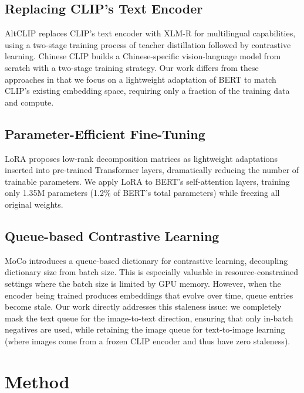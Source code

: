 \documentclass[10pt,leqno]{amsart}
\begin{document}
\subsection{Replacing CLIP's Text Encoder}

AltCLIP \citep{chen2022altclip} replaces CLIP's text encoder with XLM-R \citep{conneau2020xlmr} for multilingual capabilities, using a two-stage training process of teacher distillation followed by contrastive learning. Chinese CLIP \citep{yang2022chinese} builds a Chinese-specific vision-language model from scratch with a two-stage training strategy. Our work differs from these approaches in that we focus on a lightweight adaptation of BERT \citep{devlin2019bert} to match CLIP's existing embedding space, requiring only a fraction of the training data and compute.

\subsection{Parameter-Efficient Fine-Tuning}

LoRA \citep{hu2022lora} proposes low-rank decomposition matrices as lightweight adaptations inserted into pre-trained Transformer layers, dramatically reducing the number of trainable parameters. We apply LoRA to BERT's self-attention layers, training only 1.35M parameters (1.2\% of BERT's total parameters) while freezing all original weights.

\subsection{Queue-based Contrastive Learning}

MoCo \citep{he2020moco} introduces a queue-based dictionary for contrastive learning, decoupling dictionary size from batch size. This is especially valuable in resource-constrained settings where the batch size is limited by GPU memory. However, when the encoder being trained produces embeddings that evolve over time, queue entries become stale. Our work directly addresses this staleness issue: we completely mask the text queue for the image-to-text direction, ensuring that only in-batch negatives are used, while retaining the image queue for text-to-image learning (where images come from a frozen CLIP encoder and thus have zero staleness).

\section{Method}
\end{document}
